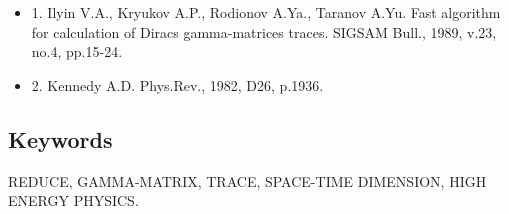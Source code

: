 \begin{itemize}

\item{1.}
Ilyin V.A., Kryukov A.P., Rodionov A.Ya., Taranov A.Yu.
Fast algorithm for calculation of Diracs gamma-matrices
traces. SIGSAM Bull., 1989, v.23, no.4, pp.15-24.

\item{2.}
Kennedy A.D. Phys.Rev., 1982, D26, p.1936.
\end{itemize}

\subsection*{Keywords}

REDUCE, GAMMA-MATRIX,  TRACE, SPACE-TIME  DIMENSION, HIGH  ENERGY PHYSICS.
